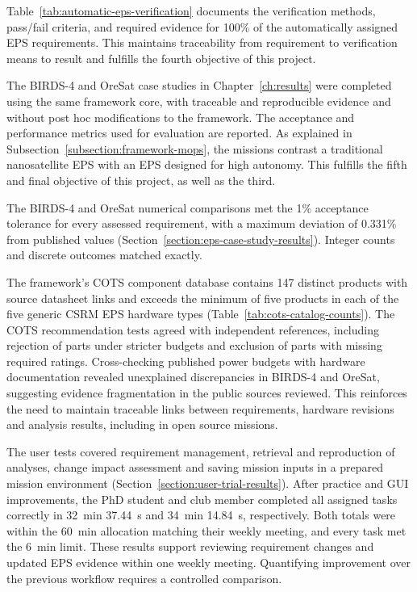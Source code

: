 Table~\ref{tab:automatic-eps-verification} documents the verification methods, pass/fail criteria, and required evidence for 100\% of the automatically assigned EPS requirements.
This maintains traceability from requirement to verification means to result and fulfills the fourth objective of this project.

The BIRDS-4 and OreSat case studies in Chapter~\ref{ch:results} were completed using the same framework core, with traceable and reproducible evidence and without post hoc modifications to the framework.
The acceptance and performance metrics used for evaluation are reported.
As explained in Subsection~\ref{subsection:framework-mops}, the missions contrast a traditional nanosatellite EPS with an EPS designed for high autonomy.
This fulfills the fifth and final objective of this project, as well as the third.

The BIRDS-4 and OreSat numerical comparisons met the 1\% acceptance tolerance for every assessed requirement, with a maximum deviation of 0.331\% from published values (Section~\ref{section:eps-case-study-results}).
Integer counts and discrete outcomes matched exactly.

The framework's COTS component database contains 147 distinct products with source datasheet links and exceeds the minimum of five products in each of the five generic CSRM EPS hardware types (Table~\ref{tab:cots-catalog-counts}).
The COTS recommendation tests agreed with independent references, including rejection of parts under stricter budgets and exclusion of parts with missing required ratings.
Cross-checking published power budgets with hardware documentation revealed unexplained discrepancies in BIRDS-4 and OreSat, suggesting evidence fragmentation in the public sources reviewed.
This reinforces the need to maintain traceable links between requirements, hardware revisions and analysis results, including in open source missions.

The user tests covered requirement management, retrieval and reproduction of analyses, change impact assessment and saving mission inputs in a prepared mission environment (Section~\ref{section:user-trial-results}).
After practice and GUI improvements, the PhD student and club member completed all assigned tasks correctly in 32~min 37.44~s and 34~min 14.84~s, respectively.
Both totals were within the 60~min allocation matching their weekly meeting, and every task met the 6~min limit.
These results support reviewing requirement changes and updated EPS evidence within one weekly meeting.
Quantifying improvement over the previous workflow requires a controlled comparison.

